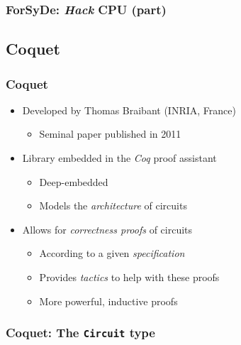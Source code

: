         \begin{frame}
            \frametitle{ForSyDe: \emph{Hack} CPU (part)}
        \end{frame}


    \subsection{Coquet}
    \label{subsec:coquet}
        \begin{frame}
            \frametitle{Coquet}

            \begin{itemize}
                \item Developed by Thomas Braibant (INRIA, France)
                    \begin{itemize}
                        \item Seminal paper published in 2011
                    \end{itemize}
                \item Library embedded in the \emph{Coq} proof assistant
                    \begin{itemize}
                        \item Deep-embedded
                        \item Models the \emph{architecture} of circuits
                    \end{itemize}
                \item Allows for \emph{correctness proofs} of circuits
                    \begin{itemize}
                        \item According to a given \emph{specification}
                        \item Provides \emph{tactics} to help with these proofs
                        \item More powerful, inductive proofs
                    \end{itemize}
            \end{itemize}
        \end{frame}

        \begin{frame}
            \frametitle{Coquet: The \texttt{Circuit} type}
        \end{frame}
        
